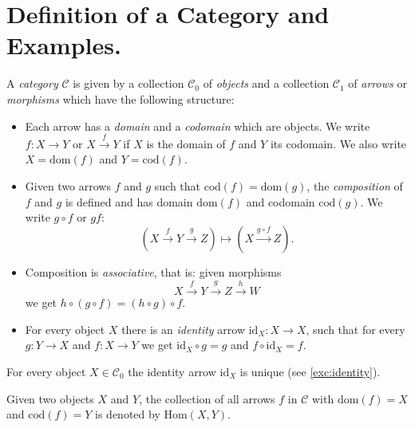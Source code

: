 \documentclass[11pt]{article}
\theoremstyle{plain}
\theoremstyle{definition}
\theoremstyle{remark}
\newcommand{\cC}{\mathcal{C}}
\newcommand{\Hom}{\mathrm{Hom}}
\newcommand{\dom}{\mathrm{dom}}
\newcommand{\cod}{\mathrm{cod}}
\newcommand{\id}{\mathrm{id}}
\begin{document}
\section{Definition of a Category and Examples.}

\begin{definition}[Category]
A {\em category} $\cC$ is given by a collection $\cC_{0}$ of 
{\em objects} and a collection $\cC_{1}$ of {\em arrows} or
{\em morphisms} which have the following structure:
\begin{itemize}
    \item Each arrow has a {\em domain} and a {\em codomain}
    which are objects. We write $f:X\to Y$ or $X\xrightarrow{f}Y$
    if $X$ is the domain of $f$ and $Y$ its codomain.
    We also write $X=\dom(f)$ and $Y=\cod(f)$.
    
    \item Given two arrows $f$ and $g$ such that
    $\cod(f)=\dom(g)$, the {\em composition} of $f$ and $g$ is
    defined and has domain $\dom(f)$ and codomain $\cod(g)$. We
    write $g\circ f$ or $gf$:
    \begin{equation*}
        (X\xrightarrow{f}Y\xrightarrow{g}Z)\mapsto
        (X\xrightarrow{g\circ f}Z).
    \end{equation*}
    
    \item Composition is {\em associative}, that is: given morphisms
    \begin{equation*}
        X\xrightarrow{f}Y\xrightarrow{g}Z\xrightarrow{h}W
    \end{equation*}
    we get $h\circ(g\circ f)=(h\circ g)\circ f$.
    
    \item For every object $X$ there is an {\em identity} arrow
    $\id_{X}:X\to X$, such that for every $g:Y\to X$ and
    $f:X\to Y$ we get $\id_{X}\circ g=g$ and $f\circ\id_{X}=f$.
\end{itemize}
\end{definition}

\begin{remark}
For every object $X\in\cC_{0}$ the identity arrow $\id_{X}$ is unique
(see \autoref{exc:identity}).
\end{remark}

\begin{definition}[$\Hom$]
Given two objects $X$ and $Y$, the collection of all arrows $f$ in 
$\cC$ with $\dom(f)=X$ and $\cod(f)=Y$ is denoted by $\Hom(X,Y)$.
\end{definition}
\end{document}
